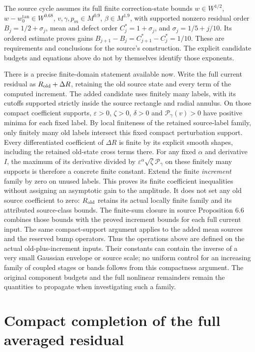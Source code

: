 The source cycle assumes its full finite correction-state bounds
$w\in W^{1/2}$, $w-w_0^{\tan}\in W^{0.68}$,
$v,\gamma,p_m\in M^{0.9}$, $\beta\in M^{1.9}$,
with supported nonzero residual order
$B_j=1/2+\sigma_j$, mean and defect order $C_j^*=1+\sigma_j$,
and $\sigma_j=1/5+j/10$. Its ordered estimate proves gains
$B_{j+1}-B_j=C_{j+1}^*-C_j^*=1/10$.
These are requirements and conclusions for the source's construction.
The explicit candidate budgets and equations above do not by
themselves identify those exponents.

There is a precise finite-domain statement available now. Write the
full current residual as $R_{\rm old}+\Delta R$, retaining the old
source state and every term of the computed increment. The added
candidate uses finitely many labels, with its cutoffs supported
strictly inside the source rectangle and radial annulus. On those
compact coefficient supports, $\varepsilon>0$, $\zeta>0$,
$\delta>0$ and $\mathcal P_\gamma(v)>0$ have positive minima
for each fixed label. By local finiteness of the retained source-label
family, only finitely many old labels intersect this fixed compact
perturbation support. Every differentiated coefficient of $\Delta R$
is finite by its explicit smooth shapes, including the retained old-state
cross terms there. For any fixed
$\alpha$ and derivative $I$, the maximum of its derivative divided by
$\varepsilon^\alpha\sqrt\zeta\mathcal P_\gamma$ on these finitely
many supports is therefore a concrete finite constant. Extend the
finite \emph{increment} family by zero on unused labels. This proves its
finite coefficient inequalities without assigning an asymptotic gain
to the amplitude. It does not set any old source coefficient to zero:
$R_{\rm old}$ retains its actual locally finite family and its attributed
source-class bounds. The finite-sum closure in source Proposition 6.6
combines those bounds with the proved increment bounds for each full
current input. The same compact-support argument applies to the added
mean sources and the reserved bump operators. Thus the operations
above are defined on the actual old-plus-increment inputs.
Their constants can contain the inverse of a very small Gaussian
envelope or source scale; no uniform control for an increasing family
of coupled stages or bands follows from this compactness argument.
The original component budgets and the full nonlinear remainders
remain the quantities to propagate when investigating such a family.


\section{Compact completion of the full averaged residual}
\label{mcstress:section}

